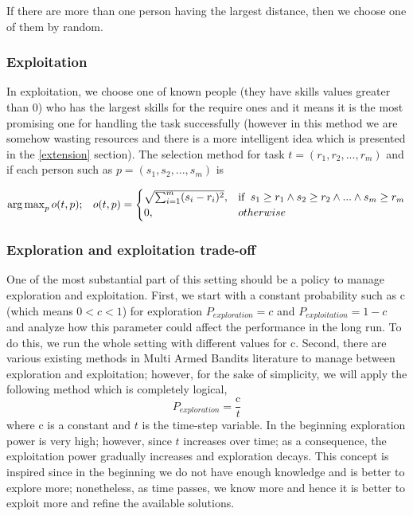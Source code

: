 \documentclass[]{article}
\begin{document}
If there are more than one person having the largest distance, then we choose one of them by random.

\subsubsection{Exploitation}
In exploitation, we choose one of known people (they have skills values greater than 0) who has the largest skills for the require ones and it means it is the most promising one for handling the task successfully (however in this method we are somehow wasting resources and there is a more intelligent idea which is presented in the \ref{extension} section). The selection method for task $t=(r_1, r_2, ..., r_m)$ and if each person such as $p=(s_1, s_2, ..., s_m) $ is

\begin{equation}
	\operatorname{arg\,max}_p o(t,p);\;\;\;
	o(t,p) = 
	\begin{cases}
		\sqrt{\sum_{i=1}^{m}(s_i-r_i)^2},	& \text{if\;\;} s_1 \geq r_1 \wedge s_2 \geq r_2 \wedge ... \wedge s_m \geq r_m\\
		0,	& otherwise
	\end{cases}
\end{equation}

\subsubsection{Exploration and exploitation trade-off}
One of the most substantial part of this setting should be a policy to manage exploration and exploitation. First, we start with a constant probability such as c (which means $0<c<1$) for exploration $P_{exploration}=c$ and $P_{exploitation}=1-c$ and analyze how this parameter could affect the performance in the long run. To do this, we run the whole setting with different values for c.
Second, there are various existing methods in Multi Armed Bandits literature \cite{auer2002finite, li2010contextual, kuleshov2014algorithms} to manage between exploration and exploitation; however, for the sake of simplicity, we will apply the following method which is completely logical,
\begin{equation}
	P_{exploration} = \frac{\text{c}}{t}
\end{equation}
where c is a constant and $t$ is the time-step variable. In the beginning exploration power is very high; however, since $t$ increases over time; as a consequence, the exploitation power gradually increases and exploration decays. This concept is inspired since in the beginning we do not have enough knowledge and is better to explore more; nonetheless, as time passes, we know more and hence it is better to exploit more and refine the available solutions.
\end{document}
